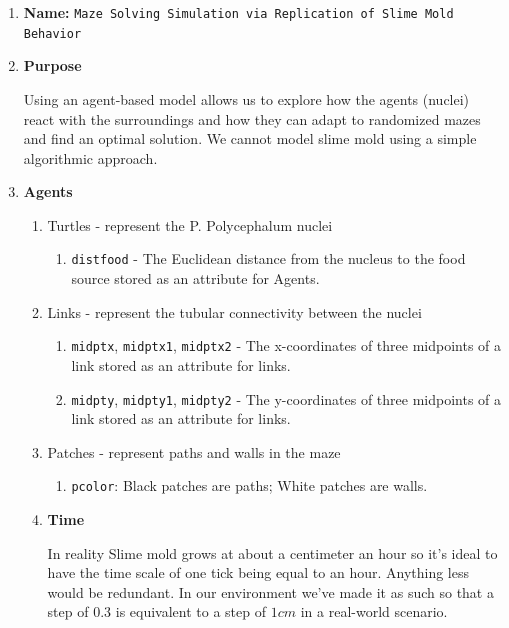 \documentclass[a4paper, 12pt]{article}
\begin{document}
\begin{enumerate}
    \item \textbf{Name: } \texttt{Maze Solving Simulation via Replication of Slime Mold Behavior}
    \item \textbf{Purpose}\par 
    Using an agent-based model allows us to explore how the agents (nuclei) react with the surroundings and how they can adapt to randomized mazes and find an optimal solution. We cannot model slime mold using a simple algorithmic approach.  
    
    \item \textbf{Agents}
        \begin{enumerate}
        \item Turtles - represent the P. Polycephalum nuclei
        \begin{enumerate}
        \item \texttt{distfood} - The Euclidean distance from the nucleus to the food source stored as an attribute for Agents.
        
        \end{enumerate}
        \item Links - represent the tubular connectivity between the nuclei
        \begin{enumerate}
            \item \texttt{midptx}, \texttt{midptx1}, \texttt{midptx2} - The x-coordinates of three midpoints of a link stored as an attribute for links. 
        \item \texttt{midpty}, \texttt{midpty1}, \texttt{midpty2} - The y-coordinates of three midpoints of a link stored as an attribute for links.
        \end{enumerate}
        \item Patches - represent paths and walls in the maze 
            \begin{enumerate}
                \item \texttt{pcolor}: Black patches are paths; White patches are walls. 
            \end{enumerate}
             
        \item \textbf{Time}\par
        In reality Slime mold grows at about a centimeter an hour so it’s ideal to have the time scale of one tick being equal to an hour. Anything less would be redundant. In our environment we've made it as such so that a step of $0.3$ is equivalent to a step of $1 cm$ in a real-world scenario.
    \end{enumerate}
    

\end{enumerate}
\end{document}
